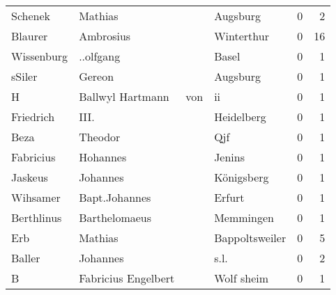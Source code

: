 \begin{center}
\begin{tiny}
\begin{longtabu}{llllrr}
                  Schenek &                            Mathias &             &                                    Augsburg &          0 &         2 \\
                  Blaurer &                          Ambrosius &             &                                  Winterthur &          0 &        16 \\
               Wissenburg &                          ..olfgang &             &                                       Basel &          0 &         1 \\
                   sSiler &                             Gereon &             &                                    Augsburg &          0 &         1 \\
                        H &                   Ballwyl Hartmann &         von &                                          ii &          0 &         1 \\
                Friedrich &                               III. &             &                                  Heidelberg &          0 &         1 \\
                     Beza &                            Theodor &             &                                         Qjf &          0 &         1 \\
                Fabricius &                           Hohannes &             &                                      Jenins &          0 &         1 \\
                  Jaskeus &                           Johannes &             &                                  Königsberg &          0 &         1 \\
                 Wihsamer &                      Bapt.Johannes &             &                                      Erfurt &          0 &         1 \\
               Berthlinus &                      Barthelomaeus &             &                                   Memmingen &          0 &         1 \\
                      Erb &                            Mathias &             &                              Bappoltsweiler &          0 &         5 \\
                   Baller &                           Johannes &             &                                        s.l. &          0 &         2 \\
                        B &                Fabricius Engelbert &             &                                  Wolf sheim &          0 &         1 \\

\end{longtabu}
\end{tiny}
\end{center}
